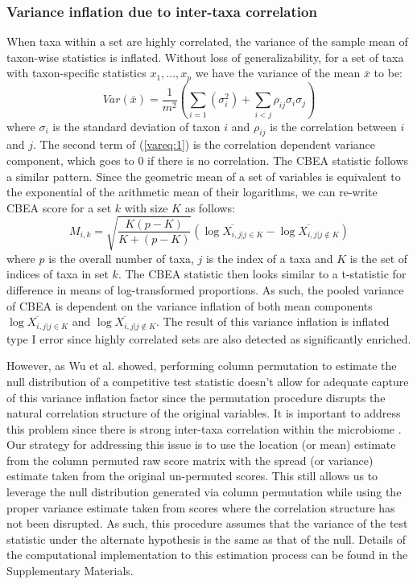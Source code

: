\subsubsection{Variance inflation due to inter-taxa correlation}  
When taxa within a set are highly correlated, the variance of the sample mean of taxon-wise statistics is inflated. Without loss of generalizability, for a set of taxa with taxon-specific statistics $x_1, ..., x_p$ we have the variance of the mean $\bar{x}$ to be:  
\begin{equation} \label{vareq:1}
    Var(\bar{x}) = \frac{1}{m^2}\left(\sum_{i = 1}(\sigma_i^2) + \sum_{i < j}\rho_{ij}\sigma_i\sigma_j\right)
\end{equation}
where $\sigma_i$ is the standard deviation of taxon $i$ and $\rho_{ij}$ is the correlation between $i$ and $j$. The second term of (\ref{vareq:1}) is the correlation dependent variance component, which goes to 0 if there is no correlation. The CBEA statistic follows a similar pattern. Since the geometric mean of a set of variables is equivalent to the exponential of the arithmetic mean of their logarithms, we can re-write CBEA score for a set $k$ with size $K$ as follows:  
\begin{equation}\label{vareq:2}
    M_{i,k} = \sqrt{\frac{K(p - K)}{K + (p - K)}} \left( \overbar{\log{X_{i,j|j \in K}}} - \overbar{\log{X_{i,j|j \notin K}}} \right)   
\end{equation}
where $p$ is the overall number of taxa, $j$ is the index of a taxa and $K$ is the set of indices of taxa in set $k$. The CBEA statistic then looks similar to a t-statistic for difference in means of log-transformed proportions. As such, the pooled variance of CBEA is dependent on the variance inflation of both mean components $\overbar{\log{X_{i,j|j \in K}}}$ and $\overbar{\log{X_{i,j|j \notin K}}}$. The result of this variance inflation is inflated type I error since highly correlated sets are also detected as significantly enriched. 

However, as Wu et al. \cite{wu2012} showed, performing column permutation to estimate the null distribution of a competitive test statistic doesn't allow for adequate capture of this variance inflation factor since the permutation procedure disrupts the natural correlation structure of the original variables. It is important to address this problem since there is strong inter-taxa correlation within the microbiome \cite{kurtz2015a}. Our strategy for addressing this issue is to use the location (or mean) estimate from the column permuted raw score matrix with the spread (or variance) estimate taken from the original un-permuted scores. This still allows us to leverage the null distribution generated via column permutation while using the proper variance estimate taken from scores where the correlation structure has not been disrupted. As such, this procedure assumes that the variance of the test statistic under the alternate hypothesis is the same as that of the null. Details of the computational implementation to this estimation process can be found in the Supplementary Materials.   

